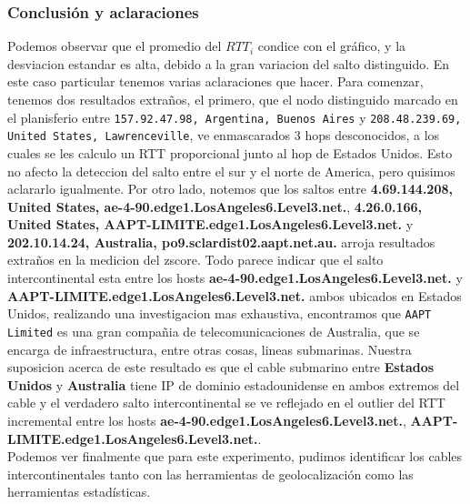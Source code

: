 \subsubsection{Conclusión y aclaraciones}
Podemos observar que el promedio del $RTT_i$ condice con el gráfico, y la desviacion estandar es alta, debido a la gran variacion del salto distinguido. En este caso particular tenemos varias aclaraciones que hacer. Para comenzar, tenemos dos resultados extraños, el primero, que el nodo distinguido marcado en el planisferio entre \texttt{157.92.47.98, Argentina, Buenos Aires} y \texttt{208.48.239.69, United States, Lawrenceville}, ve enmascarados 3 hops desconocidos, a los cuales se les calculo un RTT proporcional junto al hop de Estados Unidos. Esto no afecto la deteccion del salto entre el sur y el norte de America, pero quisimos aclararlo igualmente. Por otro lado, notemos que los saltos entre \textbf{4.69.144.208, United States, ae-4-90.edge1.LosAngeles6.Level3.net.},   \textbf{4.26.0.166, United States, AAPT-LIMITE.edge1.LosAngeles6.Level3.net.} y \textbf{202.10.14.24, Australia, po9.sclardist02.aapt.net.au.} arroja resultados extraños en la medicion del zscore. Todo parece indicar que el salto intercontinental esta entre los hosts \textbf{ae-4-90.edge1.LosAngeles6.Level3.net.} y \textbf{AAPT-LIMITE.edge1.LosAngeles6.Level3.net.} ambos ubicados en Estados Unidos, realizando una investigacion mas exhaustiva, encontramos que \texttt{AAPT Limited} es una gran compañia de telecomunicaciones de Australia, que se encarga de infraestructura, entre otras cosas, lineas submarinas. Nuestra suposicion acerca de este resultado es que el cable submarino entre \textbf{Estados Unidos} y \textbf{Australia} tiene IP de dominio estadounidense en ambos extremos del cable y el verdadero salto intercontinental se ve reflejado en el outlier del RTT incremental entre los hosts \textbf{ae-4-90.edge1.LosAngeles6.Level3.net.}, \textbf{AAPT-LIMITE.edge1.LosAngeles6.Level3.net.}.\\
Podemos ver finalmente que para este experimento, pudimos identificar los cables intercontinentales tanto con las herramientas de geolocalización como las herramientas estadísticas.

